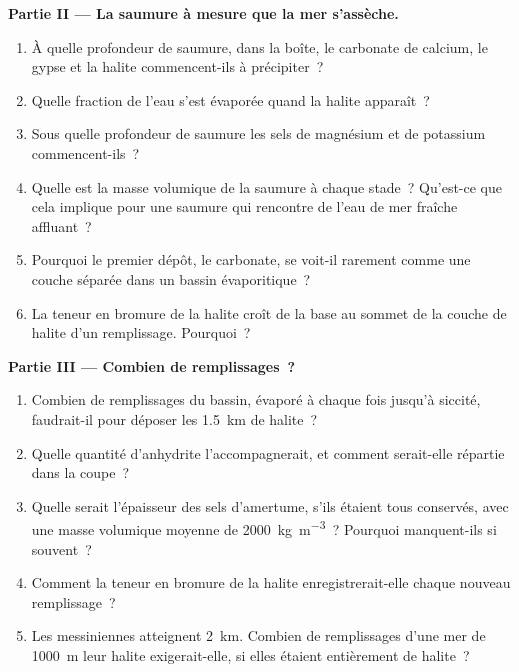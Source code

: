 \begin{problem}
\noindent\textbf{Partie II --- La saumure à mesure que la mer s'assèche.}
\begin{enumerate}[resume]
  \item À quelle profondeur de saumure, dans la boîte, le carbonate de calcium, le gypse et la
        halite commencent-ils à précipiter~?
  \item Quelle fraction de l'eau s'est évaporée quand la halite apparaît~?
  \item Sous quelle profondeur de saumure les sels de magnésium et de potassium commencent-ils~?
  \item Quelle est la masse volumique de la saumure à chaque stade~? Qu'est-ce que cela implique pour une saumure
        qui rencontre de l'eau de mer fraîche affluant~?
  \item Pourquoi le premier dépôt, le carbonate, se voit-il rarement comme une couche séparée
        dans un bassin évaporitique~?
  \item La teneur en bromure de la halite croît de la base au sommet de
        la couche de halite d'un remplissage. Pourquoi~?
\end{enumerate}

\noindent\textbf{Partie III --- Combien de remplissages~?}
\begin{enumerate}[resume]
  \item Combien de remplissages du bassin, évaporé à chaque fois jusqu'à siccité, faudrait-il
        pour déposer les \qty{1.5}{km} de halite~?
  \item Quelle quantité d'anhydrite l'accompagnerait, et comment serait-elle
        répartie dans la coupe~?
  \item Quelle serait l'épaisseur des sels d'amertume, s'ils étaient tous conservés, avec une
        masse volumique moyenne de \qty{2000}{kg.m^{-3}}~? Pourquoi manquent-ils si souvent~?
  \item Comment la teneur en bromure de la halite enregistrerait-elle chaque nouveau remplissage~?
  \item Les  messiniennes atteignent \qty{2}{km}. Combien de remplissages d'une
        mer de \qty{1000}{m} leur halite exigerait-elle, si elles étaient entièrement de halite~?
\end{enumerate}


\end{problem}

